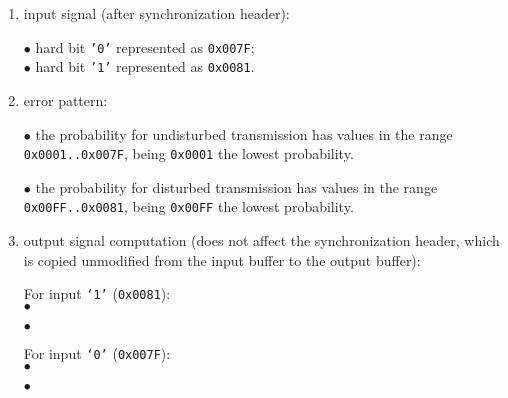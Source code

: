 \begin{enumerate}
 \item input signal (after synchronization header):

     $\bullet$ hard bit {\tt '0'} represented as {\tt 0x007F}; \\
     $\bullet$ hard bit {\tt '1'} represented as {\tt 0x0081}.\\

 \item error pattern:

       $\bullet$ the probability for undisturbed transmission has values
                 in the range {\tt 0x0001..\-0x007F}, 
                 being {\tt 0x0001} the lowest probability.

       $\bullet$ the probability for disturbed transmission has values
                 in the range {\tt 0x00FF..\-0x0081}, 
                 being {\tt 0x00FF} the lowest probability.

 \item output signal computation (does not affect the synchronization
        header, which is copied unmodified from the input buffer to
        the output buffer):

        For input {\tt `1'} ({\tt 0x0081}): \\
          $\bullet$ 

          $\bullet$ 

        For input {\tt `0'} ({\tt 0x007F}): \\
          $\bullet$ 

          $\bullet$ 
\end{enumerate}

\def\labelenumi{\arabic{enumi}.}
\def\theenumi{\arabic{enumi}}


